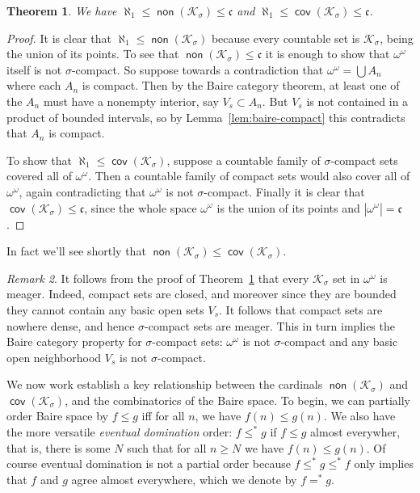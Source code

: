 \documentclass[11pt,oneside]{amsbook}
\newcommand{\Ksigma}{\mathcal K_\sigma}
\DeclareMathOperator{\non}{\mathsf{non}}
\DeclareMathOperator{\cov}{\mathsf{cov}}
\theoremstyle{definition}
\theoremstyle{plain}
\newtheorem{thm}{Theorem}[section]
\theoremstyle{definition}
\theoremstyle{remark}
\newtheorem{rem}[thm]{Remark}
\begin{document}
\begin{thm}
  \label{thm:k-sigma}
  We have $\aleph_1\leq\non(\Ksigma)\leq\mathfrak c$ and $\aleph_1\leq\cov(\Ksigma)\leq\mathfrak c$.
\end{thm}

\begin{proof}
  It is clear that $\aleph_1\leq\non(\Ksigma)$ because every countable set is $\Ksigma$, being the union of its points. To see that $\non(\Ksigma)\leq\mathfrak c$ it is enough to show that $\omega^\omega$ itself is not $\sigma$-compact. So suppose towards a contradiction that $\omega^\omega=\bigcup A_n$ where each $A_n$ is compact. Then by the Baire category theorem, at least one of the $A_n$ must have a nonempty interior, say $V_s\subset A_n$. But $V_s$ is not contained in a product of bounded intervals, so by Lemma~\ref{lem:baire-compact} this contradicts that $A_n$ is compact.

  To show that $\aleph_1\leq\cov(\Ksigma)$, suppose a countable family of $\sigma$-compact sets covered all of $\omega^\omega$. Then a countable family of compact sets would also cover all of $\omega^\omega$, again contradicting that $\omega^\omega$ is not $\sigma$-compact. Finally it is clear that $\cov(\Ksigma)\leq\mathfrak c$, since the whole space $\omega^\omega$ is the union of its points and $|\omega^\omega|=\mathfrak c$.
\end{proof}

In fact we'll see shortly that $\non(\Ksigma)\leq\cov(\Ksigma)$.

\begin{rem}
  \label{rem:ksigma-meager}
  It follows from the proof of Theorem~\ref{thm:k-sigma} that every $\Ksigma$ set in $\omega^\omega$ is meager. Indeed, compact sets are closed, and moreover since they are bounded they cannot contain any basic open sets $V_s$. It follows that compact sets are nowhere dense, and hence $\sigma$-compact sets are meager. This in turn implies the Baire category property for $\sigma$-compact sets: $\omega^\omega$ is not $\sigma$-compact and any basic open neighborhood $V_s$ is not $\sigma$-compact.
\end{rem}

We now work establish a key relationship between the cardinals $\non(\Ksigma)$ and $\cov(\Ksigma)$, and the combinatorics of the Baire space. To begin, we can partially order Baire space by $f\leq g$ iff for all $n$, we have $f(n)\leq g(n)$. We also have the more versatile \emph{eventual domination} order: $f\leq^*g$ if $f\leq g$ almost everywher, that is, there is some $N$ such that for all $n\geq N$ we have $f(n)\leq g(n)$. Of course eventual domination is not a partial order because $f\leq^*g\leq^*f$ only implies that $f$ and $g$ agree almost everywhere, which we denote by $f=^*g$.
\end{document}
